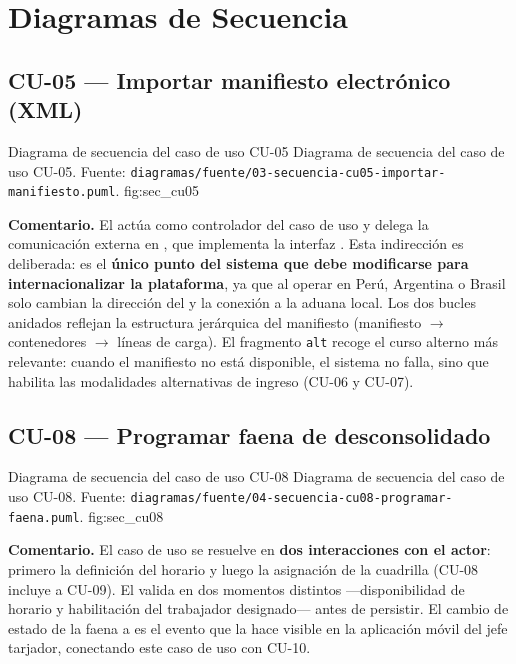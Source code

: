 \section{Diagramas de Secuencia}
\label{sec:secuencia}

\subsection{CU-05 --- Importar manifiesto electrónico (XML)}
\label{subsec:sec_cu05}

{Diagrama de secuencia del caso de uso CU-05}
{Diagrama de secuencia del caso de uso CU-05. Fuente:
\texttt{diagramas/fuente/03-secuencia-cu05-importar-manifiesto.puml}.}
{fig:sec_cu05}

\textbf{Comentario.} El  actúa como controlador del caso de uso y delega la
comunicación externa en , que implementa la interfaz
. Esta indirección es deliberada: es el \textbf{único punto del sistema que
debe modificarse para internacionalizar la plataforma}, ya que al operar en Perú, Argentina o
Brasil solo cambian la dirección del  y la conexión a la aduana local. Los dos
bucles anidados reflejan la estructura jerárquica del manifiesto (manifiesto $\rightarrow$
contenedores $\rightarrow$ líneas de carga). El fragmento \texttt{alt} recoge el curso alterno más
relevante: cuando el manifiesto no está disponible, el sistema no falla, sino que habilita las
modalidades alternativas de ingreso (CU-06 y CU-07).

\subsection{CU-08 --- Programar faena de desconsolidado}
\label{subsec:sec_cu08}

{Diagrama de secuencia del caso de uso CU-08}
{Diagrama de secuencia del caso de uso CU-08. Fuente:
\texttt{diagramas/fuente/04-secuencia-cu08-programar-faena.puml}.}
{fig:sec_cu08}

\textbf{Comentario.} El caso de uso se resuelve en \textbf{dos interacciones con el actor}: primero
la definición del horario y luego la asignación de la cuadrilla (CU-08 incluye a CU-09). El
 valida en dos momentos distintos ---disponibilidad de horario y
habilitación del trabajador designado--- antes de persistir. El cambio de estado de la faena a
 es el evento que la hace visible en la aplicación móvil del jefe tarjador,
conectando este caso de uso con CU-10.

